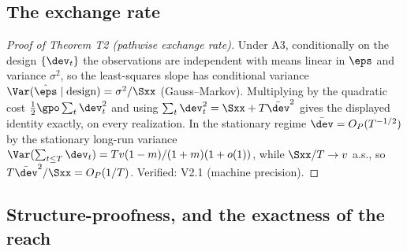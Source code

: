 \subsection*{The exchange rate}

\begin{proof}[Proof of Theorem T2 (pathwise exchange rate)]
Under A3, conditionally on the design $\{\dev_t\}$ the observations are
independent with means linear in $\eps$ and variance $\sigma^2$, so the
least-squares slope has conditional variance
$\Var(\hat\eps \mid \mathrm{design}) = \sigma^2/\Sxx$ (Gauss--Markov).
Multiplying by the quadratic cost $\tfrac{1}{2}\gpo \sum_t \dev_t^2$ and
using $\sum_t \dev_t^2 = \Sxx + T\bar\dev^2$ gives the displayed identity
exactly, on every realization. In the stationary regime
$\bar\dev = O_P(T^{-1/2})$ by the stationary long-run variance $\Var(\sum_{t\le T}\dev_t) = T v (1-m)/(1+m)(1+o(1))$, while
$\Sxx/T \to v$ a.s., so $T\bar\dev^2/\Sxx = O_P(1/T)$. Verified: V2.1
(machine precision).
\end{proof}


\subsection*{Structure-proofness, and the exactness of the reach}


